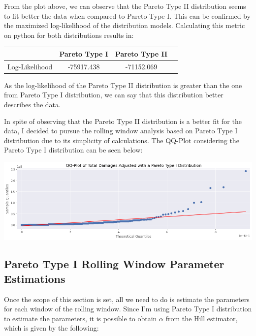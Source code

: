 \documentclass[paper=a4, fontsize=11pt]{scrartcl} %
\begin{document}
From the plot above, we can observe that the Pareto Type II distribution seems to fit better the data when compared to Pareto Type I. This can be confirmed by the maximized log-likelihood of the distribution models. Calculating this metric on python for both distributions results in:

\begin{center}
    \begin{tabular}{ |c|c|c|c| } 
        \hline
            & Pareto Type I & Pareto Type II \\
        \hline
            Log-Likelihood & -75917.438 & -71152.069 \\
        \hline
    \end{tabular}
\end{center}

As the log-likelihood of the Pareto Type II distribution is greater than the one from Pareto Type I distribution, we can say that this distribution better describes the data.

In spite of observing that the Pareto Type II distribution is a better fit for the data, I decided to pursue the rolling window analysis based on Pareto Type I distribution due to its simplicity of calculations. The QQ-Plot considering the Pareto Type I distribution can be seen below:

\begin{center}
    \includegraphics[scale=0.5]{imgs/qqplot.png}
\end{center}

\subsection{Pareto Type I Rolling Window Parameter Estimations}

Once the scope of this section is set, all we need to do is estimate the parameters for each window of the rolling window. Since I'm using Pareto Type I distribution to estimate the parameters, it is possible to obtain $\alpha$ from the Hill estimator, which is given by the following:
\end{document}
